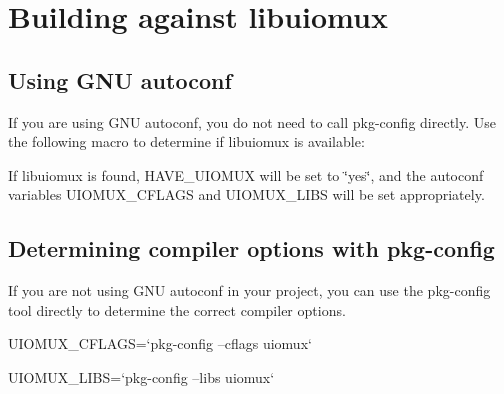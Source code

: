 \section{Building against libuiomux}
\label{group__building}
\subsection{Using GNU autoconf}\label{group__building_autoconf}
If you are using GNU autoconf, you do not need to call pkg-\/config directly. Use the following macro to determine if libuiomux is available:




If libuiomux is found, HAVE\_\-UIOMUX will be set to \char`\"{}yes\char`\"{}, and the autoconf variables UIOMUX\_\-CFLAGS and UIOMUX\_\-LIBS will be set appropriately.\subsection{Determining compiler options with pkg-\/config}\label{group__building_pkg-config}
If you are not using GNU autoconf in your project, you can use the pkg-\/config tool directly to determine the correct compiler options.


\begin{DoxyPre}
 UIOMUX\_CFLAGS=`pkg-config --cflags uiomux`\end{DoxyPre}



\begin{DoxyPre} UIOMUX\_LIBS=`pkg-config --libs uiomux`
 \end{DoxyPre}
 
